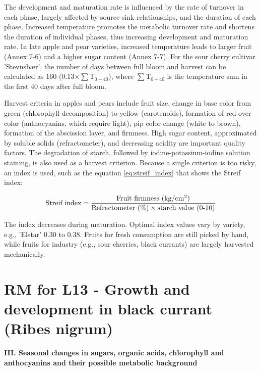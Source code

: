 \vspace{0.5em}
The development and maturation rate is influenced by the rate of turnover in each phase, largely affected by source-sink relationships, and the duration of each phase. Increased temperature promotes the metabolic turnover rate and shortens the duration of individual phases, thus increasing development and maturation rate. In late apple and pear varieties, increased temperature leads to larger fruit (Annex 7-6) and a higher sugar content (Annex 7-7). For the sour cherry cultivar 'Stevnsbær', the number of days between full bloom and harvest can be calculated as 160-(0.13$\times \sum$T$_{0-40}$), where $\sum$T$_{0-40}$ is the temperature sum in the first 40 days after full bloom.

\vspace{0.5em}
Harvest criteria in apples and pears include fruit size, change in base color from green (chlorophyll decomposition) to yellow (carotenoids), formation of red over color (anthocyanins, which require light), pip color change (white to brown), formation of the abscission layer, and firmness. High sugar content, approximated by soluble solids (refractometer), and decreasing acidity are important quality factors. The degradation of starch, followed by iodine-potassium-iodine solution staining, is also used as a harvest criterion. Because a single criterion is too risky, an index is used, such as the equation \ref{eq:streif_index} that shows the Streif index: 

\begin{equation}
\text{Streif index} = 
\frac   {\text{Fruit firmness (kg/cm$^2$)}}
        {\text{Refractometer (\%\text)} \times \text{starch value (0-10)}}
\label{eq:streif_index}
\end{equation}

\vspace{0.5em}
The index decreases during maturation. Optimal index values vary by variety, e.g., 'Elstar' 0.30 to 0.38. Fruits for fresh consumption are still picked by hand, while fruits for industry (e.g., sour cherries, black currants) are largely harvested mechanically.


\section{RM for L13 - Growth and development in black currant (Ribes nigrum)}
\textbf{III. Seasonal changes in sugars, organic acids, chlorophyll and anthocyanins and their possible metabolic background}

